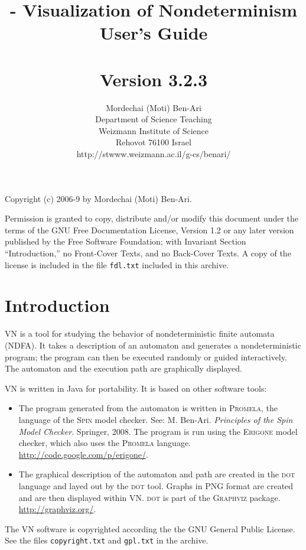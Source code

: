 \documentclass[11pt]{article}
\title{\vn{} - Visualization of Nondeterminism\\
User's Guide\\\mbox{}\\\large{Version 3.2.3}}
\author{Mordechai (Moti) Ben-Ari\\
Department of Science Teaching\\
Weizmann Institute of Science\\
Rehovot 76100 Israel\\
\textsf{http://stwww.weizmann.ac.il/g-cs/benari/}}
\newcommand{\vn}{\textsc{VN}}
\newcommand{\dt}{\textsc{dot}}
\newcommand{\spn}{\textsc{Spin}}
\newcommand{\prm}{\textsc{Promela}}
\newcommand{\erg}{\textsc{Erigone}}
\newcommand{\p}[1]{\texttt{#1}}
\begin{document}
\maketitle
\thispagestyle{empty}

\vfil

\begin{center}
Copyright (c) 2006-9 by Mordechai (Moti) Ben-Ari.
\end{center}

Permission is granted to copy, distribute and/or modify this document
under the terms of the GNU Free Documentation License, Version 1.2 or
any later version published by the Free Software Foundation; with
Invariant Section ``Introduction,'' no Front-Cover Texts, and no
Back-Cover Texts. A copy of the license is included in the file
\p{fdl.txt} included in this archive.

\newpage

\section{Introduction}

\vn{} is a tool for studying the behavior of nondeterministic finite
automata (NDFA). It takes a description of an automaton and generates a
nondeterministic program; the program can then be executed randomly or
guided interactively. The automaton and the execution path are
graphically displayed.

\vn{} is written in Java for portability. It is based on other software
tools:

\begin{itemize}
\item The program generated from the automaton is written in \prm{}, the
language of the \spn{} model checker. See: M. Ben-Ari.
\textit{Principles of the Spin Model Checker}. Springer, 2008. The
program is run using the \erg{} model checker, which also uses the
\prm{} language. \url{http://code.google.com/p/erigone/}.

\item The graphical description of the automaton and path are created in
the \dt{} language and layed out by the \dt{} tool. Graphs in PNG format
are created and are then displayed within \vn{}. \dt{} is part of the
\textsc{Graphviz} package. \url{http://graphviz.org/}.
\end{itemize}

The \vn{} software is copyrighted according the the GNU General Public
License. See the files \p{copyright.txt} and \p{gpl.txt} in the archive.
\end{document}
